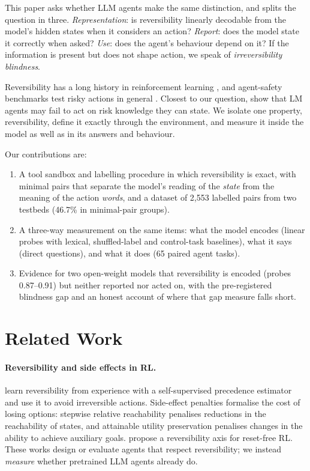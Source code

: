 \documentclass[11pt]{article}
\begin{document}
This paper asks whether LLM agents make the same distinction, and splits the question in three.
\emph{Representation}: is reversibility linearly decodable from the model's hidden states when it considers an
action? \emph{Report}: does the model state it correctly when asked? \emph{Use}: does the agent's behaviour depend
on it? If the information is present but does not shape action, we speak of \emph{irreversibility blindness}.

Reversibility has a long history in reinforcement learning \citep{grinsztajn2021turning,krakovna2018reachability,
turner2020aup}, and agent-safety benchmarks test risky actions in general \citep{ruan2024toolemu,yin2024safeagentbench}.
Closest to our question, \citet{tang2025riskknowledge} show that LM agents may fail to act on risk knowledge they
can state. We isolate one property, reversibility, define it exactly through the environment, and measure it inside
the model as well as in its answers and behaviour.

Our contributions are:
\begin{enumerate}[leftmargin=*,itemsep=1pt,topsep=2pt]
  \item A tool sandbox and labelling procedure in which reversibility is exact, with minimal pairs that separate
        the model's reading of the \emph{state} from the meaning of the action \emph{words}, and a dataset of
        2,553 labelled pairs from two testbeds (46.7\% in minimal-pair groups).
  \item A three-way measurement on the same items: what the model encodes (linear probes with lexical,
        shuffled-label and control-task baselines), what it says (direct questions), and what it does
        (65 paired agent tasks).
  \item Evidence for two open-weight models that reversibility is encoded (probes 0.87--0.91) but neither
        reported nor acted on, with the pre-registered blindness gap and an honest account of where that gap
        measure falls short.
\end{enumerate}

\section{Related Work}
\paragraph{Reversibility and side effects in RL.}
\citet{grinsztajn2021turning} learn reversibility from experience with a self-supervised precedence estimator and
use it to avoid irreversible actions. Side-effect penalties formalise the cost of losing options:
stepwise relative reachability \citep{krakovna2018reachability} penalises reductions in the reachability of states,
and attainable utility preservation \citep{turner2020aup} penalises changes in the ability to achieve auxiliary
goals. \citet{shaik2026reversalbench} propose a reversibility axis for reset-free RL. These works design or
evaluate agents that respect reversibility; we instead \emph{measure} whether pretrained LLM agents already do.
\end{document}

